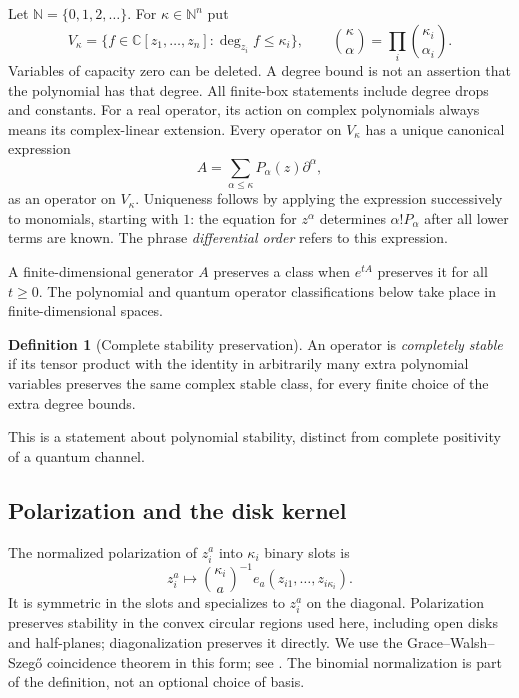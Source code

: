 \documentclass[reqno]{amsart}
\theoremstyle{definition}
\newtheorem{definition}[theorem]{Definition}
\theoremstyle{remark}
\newcommand{\C}{\mathbb C}
\newcommand{\N}{\mathbb N}
\begin{document}
Let $\N=\{0,1,2,\ldots\}$. For $\kappa\in\N^n$ put
\[
 V_\kappa=\{f\in\C[z_1,\ldots,z_n]:\deg_{z_i}f\leq\kappa_i\},
 \qquad
 \binom{\kappa}{\alpha}=\prod_i\binom{\kappa_i}{\alpha_i}.
\]
Variables of capacity zero can be deleted. A degree bound is not an
assertion that the polynomial has that degree. All finite-box statements
include degree drops and constants. For a real operator, its action on
complex polynomials always means its complex-linear extension.
Every operator on $V_\kappa$ has a unique canonical expression
\begin{equation}\label{pre:normal-order}
 A=\sum_{\alpha\leq\kappa}P_\alpha(z)\partial^\alpha,
\end{equation}
as an operator on $V_\kappa$. Uniqueness follows by applying the expression
successively to monomials, starting with $1$: the equation for $z^\alpha$
determines $\alpha!P_\alpha$ after all lower terms are known. The phrase
\emph{differential order} refers to this expression.

A finite-dimensional generator $A$ preserves a class when $e^{tA}$
preserves it for all $t\geq0$. The polynomial and quantum operator
classifications below take place in finite-dimensional spaces.

\begin{definition}[Complete stability preservation]\label{pre:complete}
An operator is \emph{completely stable} if its tensor product with the
identity in arbitrarily many extra polynomial variables preserves the
same complex stable class, for every finite choice of the extra degree
bounds.
\end{definition}
This is a statement about polynomial
stability, distinct from complete positivity of a quantum channel.


\subsection{Polarization and the disk kernel}
The normalized polarization of $z_i^a$ into $\kappa_i$ binary slots is
\[
 z_i^a\longmapsto
 \binom{\kappa_i}{a}^{-1}
 e_a(z_{i1},\ldots,z_{i\kappa_i}).
\]
It is symmetric in the slots and specializes to $z_i^a$ on the diagonal.
Polarization preserves stability in the convex circular regions used
here, including open disks and half-planes; diagonalization preserves
it directly. We use the Grace--Walsh--Szeg\H{o} coincidence
theorem in this form; see \cite{BB09,BB10II,BB09Circular}.
The binomial normalization is part of the definition, not an optional
choice of basis.\label{pre:polarization}
\end{document}

